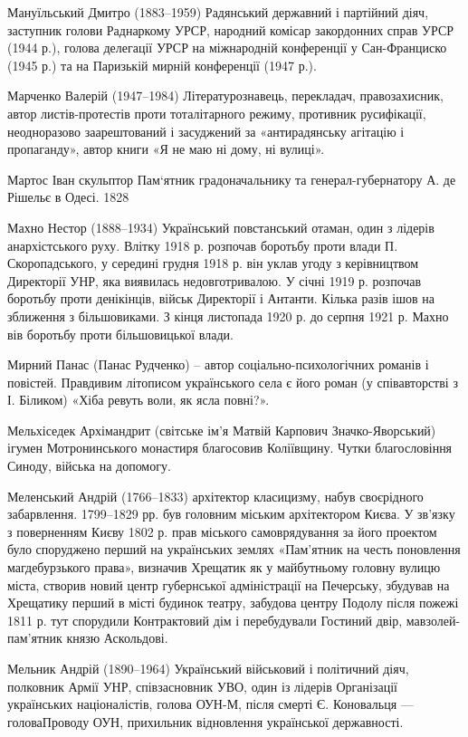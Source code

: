 Мануїльський Дмитро (1883–1959) Радянський державний і партійний діяч, заступник голови Раднаркому УРСР, народний комісар закордонних справ УРСР (1944 р.), голова делегації УРСР на міжнародній конференції у Сан-Франциско (1945 р.) та на Паризькій мирній конференції (1947 р.).

Марченко Валерій (1947–1984) Літературознавець, перекладач, правозахисник, автор листів-протестів проти тоталітарного режиму, противник русифікації, неодноразово заарештований і засуджений за «антирадянську агітацію і пропаганду», автор книги «Я не маю ні дому, ні вулиці».

Мартос Іван скульптор  Пам‘ятник градоначальнику та генерал-губернатору А. де Рішельє в Одесі. 1828 

Махно Нестор (1888–1934) Український повстанський отаман, один з лідерів анархістського руху. Влітку 1918 р. розпочав боротьбу проти влади П. Скоропадського, у середині грудня 1918 р. він уклав угоду з керівництвом Директорії УНР, яка виявилась недовготривалою. У січні 1919 р. розпочав боротьбу проти денікінців, військ Директорії і Антанти. Кілька разів ішов на зближення з більшовиками. З кінця листопада 1920 р. до серпня 1921 р. Махно вів боротьбу проти більшовицької влади. 

Мирний Панас  (Панас Рудченко) – автор соціально-психологічних романів і повістей. Правдивим літописом українського села є його роман (у співавторстві з І. Біликом) «Хіба ревуть воли, як ясла повні?». 

Мельхіседек Архімандрит (світське ім'я Матвій Карпович Значко-Яворський)  ігумен Мотронинського монастиря  благосовив Коліївщину. Чутки благословіння Синоду, війська на допомогу. 

Меленський Андрій (1766–1833) архітектор класицизму, набув своєрідного забарвлення. 1799–1829 рр. був головним міським архітектором Києва. У зв’язку з поверненням Києву 1802 р. прав міського самоврядування за його проектом було споруджено перший на українських землях «Пам’ятник на честь поновлення магдебурзького права», визначив Хрещатик як у майбутньому головну вулицю міста, створив новий центр губернської адміністрації на Печерську, збудував на Хрещатику перший в місті будинок театру, забудова центру Подолу після пожежі 1811 р. тут спорудили Контрактовий дім і перебудували Гостиний двір,  мавзолей-пам’ятник князю Аскольдові. 

Мельник Андрій (1890–1964) Український військовий і політичний діяч, полковник Армії УНР, співзасновник УВО, один із лідерів Організації українських націоналістів, голова ОУН-М, після смерті Є. Коновальця — головаПроводу ОУН, прихильник відновлення української державності. 

